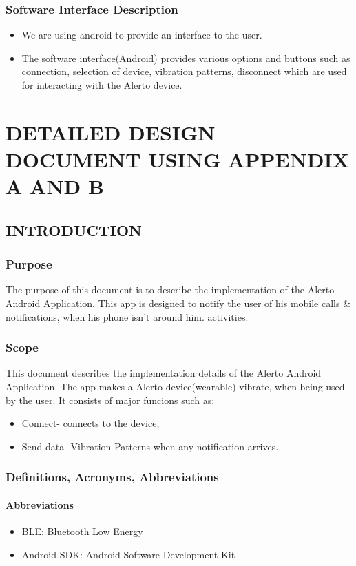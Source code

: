 \documentclass[12pt,a4paper]{report}
\begin{document}
\subsection{Software Interface Description}
\begin{itemize}
	\item We are using android to provide an interface to the user.
	\item The software interface(Android) provides various options and buttons such as connection, selection of device, vibration patterns, disconnect which are used for interacting with the Alerto device.
	
\end{itemize}

\chapter{DETAILED DESIGN DOCUMENT USING APPENDIX A AND B}
\newpage

\section{INTRODUCTION}
\subsection{Purpose}
The purpose of this document is to describe the implementation of the Alerto Android Application. This app is designed to notify the user of his mobile calls \& notifications, when his phone isn't around him.
activities.
\subsection{Scope}
This document describes the implementation details of the Alerto Android Application. The app makes a Alerto device(wearable) vibrate, when being used by the user. It consists of major funcions such as: 
\begin{itemize}
\item	Connect- connects to the device; 
\item Send data- Vibration Patterns when any notification arrives.
\end{itemize}
\subsection{ Definitions, Acronyms, Abbreviations}
\subsubsection{Abbreviations}
\begin{itemize}
\item BLE: Bluetooth Low Energy
\item Android SDK: Android Software Development Kit
\end{itemize}
\end{document}
